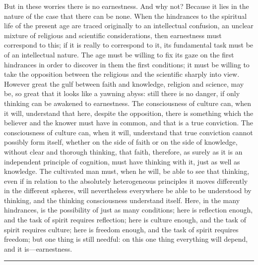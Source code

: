 \documentclass[12pt]{book}
\newcommand{\opage}[1]{\marginnote{\footnotesize\textit{[#1]}}}
\begin{document}
But in these worries there is no earnestness. And why not? Because it
lies in the nature of the case that there
\opage{72}\setcounter{footnote}{0}%
can be none. When the hindrances to the spiritual life of the present
age are traced originally to an intellectual confusion, an unclear
mixture of religious and scientific considerations, then earnestness
must correspond to this; if it is really to correspond to it, its
fundamental task must be of an intellectual nature. The age must be
willing to fix its gaze on the first hindrances in order to discover in
them the first conditions; it must be willing to take the opposition
between the religious and the scientific sharply into view. However
great the gulf between faith and knowledge, religion and science, may
be, so great that it looks like a yawning abyss: still there is no
danger, if only thinking can be awakened to earnestness. The
consciousness of culture can, when it will, understand that here,
despite the opposition, there is something which the believer and the
knower must have in common, and that is a true conviction. The
consciousness of culture can, when it will, understand that true
conviction cannot possibly form itself, whether on the side of faith or
on the side of knowledge, without clear and thorough thinking, that
faith, therefore, as surely as it is an independent principle of
cognition, must have thinking with it, just as well as knowledge. The
cultivated man must, when he will, be able to see that thinking, even if
in relation to the absolutely heterogeneous principles it moves
differently in the different spheres, will nevertheless everywhere be
able to be understood by thinking, and the thinking consciousness
understand itself.
Here, in the many hindrances, is the possibility of just as many
conditions; here is reflection enough, and the task of spirit requires
reflection; here is culture enough, and the task of spirit requires
culture; here is freedom enough, and the task of spirit requires
freedom; but one thing is still needful: on this one thing everything
will depend, and it is---earnestness.

\begin{center}\rule{3cm}{0.4pt}\end{center}
\end{document}
